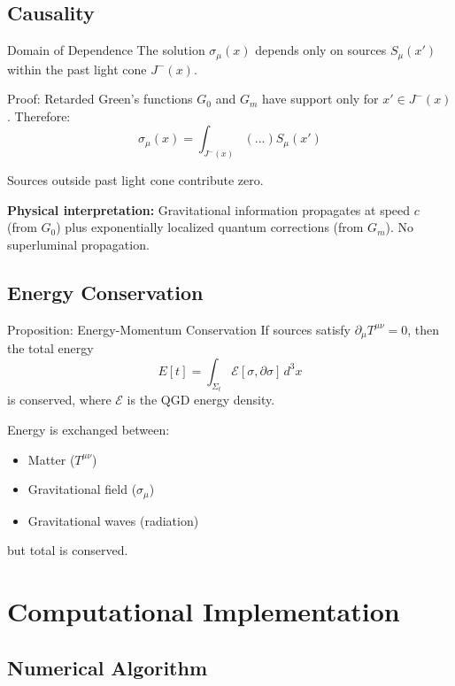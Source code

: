 \documentclass[11pt,a4paper]{article}
\theoremstyle{definition}
\theoremstyle{remark}
\begin{document}
		\subsection{Causality}
		
		Domain of Dependence
			The solution $\sigma_\mu(x)$ depends only on sources $S_\mu(x')$ within the past light cone $J^-(x)$.
		
		Proof:
			Retarded Green's functions $G_0$ and $G_m$ have support only for $x' \in J^-(x)$. Therefore:
			\begin{equation}
				\sigma_\mu(x) = \int_{J^-(x)} (...) S_\mu(x')
			\end{equation}
			
			Sources outside past light cone contribute zero.
		
		\textbf{Physical interpretation:} Gravitational information propagates at speed $c$ (from $G_0$) plus exponentially localized quantum corrections (from $G_m$). No superluminal propagation.
		
		\subsection{Energy Conservation}
		
		Proposition: Energy-Momentum Conservation
			If sources satisfy $\partial_\mu T^{\mu\nu} = 0$, then the total energy
			\begin{equation}
				E[t] = \int_{\Sigma_t} \mathcal{E}[\sigma, \partial\sigma]\,d^3x
			\end{equation}
			is conserved, where $\mathcal{E}$ is the QGD energy density.
		
		Energy is exchanged between:
		\begin{itemize}
			\item Matter ($T^{\mu\nu}$)
			\item Gravitational field ($\sigma_\mu$)
			\item Gravitational waves (radiation)
		\end{itemize}
		
		but total is conserved.
		
		\section{Computational Implementation}
		
		\subsection{Numerical Algorithm}
		
\end{document}
